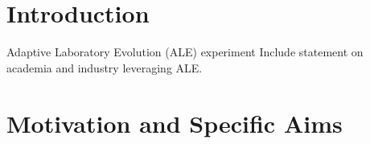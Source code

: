 \documentclass[12pt,final,masters,chapterheads]{ucsd}  %
\begin{document}
%





%   
%   
%
\chapter{Introduction}

%
%

%
%

%
%
%
%

Adaptive Laboratory Evolution (ALE) experiment
Include statement on academia and industry leveraging ALE.

\chapter{Motivation and Specific Aims}

%
%
%
%
\end{document}
